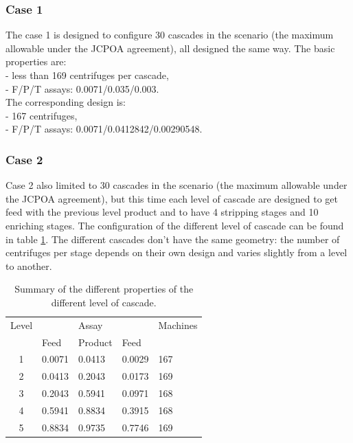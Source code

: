 \documentclass{anstrans}
\begin{document}
\subsubsection{Case 1}
The case 1 is designed to configure 30 cascades in the scenario (the maximum allowable under
the JCPOA agreement), all designed the same way. The basic properties are:\\
- less than 169 centrifuges per cascade,\\
- F/P/T assays: 0.0071/0.035/0.003.\\
The corresponding design is:\\
- 167 centrifuges,\\
- F/P/T assays: 0.0071/0.0412842/0.00290548.\\

\subsubsection{Case 2}
Case 2 also limited to 30 cascades in the scenario (the maximum allowable under
the JCPOA agreement), but this time each level of cascade are designed to get
feed with the previous level product and to have 4 stripping stages and 10
enriching stages. The configuration of the different level of cascade can be
found in table \ref{tab:cascadelvl}. The different cascades don't have the same
geometry: the number of centrifuges per stage depends on their own design and
varies slightly from a level to another.

\begin{table}[htb]
\centering
\begin{tabular}{cllll}
\toprule

Level   &           & Assay     &       & Machines  \\
        & Feed      & Product   & Feed  &           \\
\midrule
1       & 0.0071    & 0.0413    & 0.0029 & 167       \\
2       & 0.0413    & 0.2043    & 0.0173 & 169       \\
3       & 0.2043    & 0.5941    & 0.0971 & 168       \\
4       & 0.5941    & 0.8834    & 0.3915 & 168       \\
5       & 0.8834    & 0.9735    & 0.7746 & 169       \\

\bottomrule
\end{tabular}
  \caption{Summary of the different properties of the different level of cascade.}
  \label{tab:cascadelvl}
\end{table}
\end{document}
